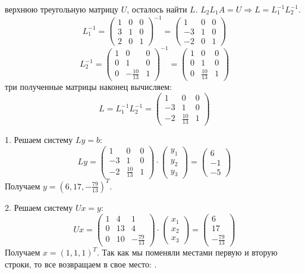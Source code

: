 \documentclass[9pt]{article}
\begin{document}
 верхнюю треугольную матрицу \(U\), осталось найти \(L\). \(L_2L_1A=U \Rightarrow L=L_1^{-1}L_2^{-1}\).
\[L_1^{-1}=\left(
\begin{array}{ccc}
    1 & 0 & 0\\
    3 & 1 & 0\\
    2 & 0 & 1
\end{array}
\right)^{-1}=\left(
\begin{array}{ccc}
    1 & 0 & 0\\
    -3 & 1 & 0\\
    -2 & 0 & 1
\end{array}
\right)\]
\[L_2^{-1}=\left(
\begin{array}{ccc}
    1 & 0 & 0\\
    0 & 1 & 0\\
    0 & -\frac{10}{13} & 1
\end{array}
\right)^{-1}=\left(
\begin{array}{ccc}
    1 & 0 & 0\\
    0 & 1 & 0\\
    0 & \frac{10}{13} & 1
\end{array}
\right)\]
 три полученные матрицы наконец вычисляем:
\[L=L_1^{-1}L_2^{-1}=\left(
\begin{array}{ccc}
    1 & 0 & 0\\
    -3 & 1 & 0\\
    -2 & \frac{10}{13} & 1
\end{array}
\right)\]
\par1. Решаем систему \(Ly=b\):
\[Ly=\left(
\begin{array}{ccc}
    1 & 0 & 0\\
    -3 & 1 & 0\\
    -2 & \frac{10}{13} & 1
\end{array}
\right)\cdot\left(
\begin{array}{c}
    y_1\\
    y_2\\
    y_3
\end{array}
\right)=\left(
\begin{array}{c}
    6\\
    -1\\
    -5
\end{array}
\right)\]
Получаем \(y=(6, 17, -\frac{79}{13})^T\).
\par2. Решаем систему \(Ux=y\):
\[Ux=\left(
\begin{array}{ccc}
    1 & 4 & 1\\
    0 & 13 & 4\\
    0 & 10 & -\frac{79}{13}
\end{array}
\right)\cdot\left(
\begin{array}{c}
    x_1\\
    x_2\\
    x_3
\end{array}
\right)=\left(
\begin{array}{c}
    6\\
    17\\
    -\frac{79}{13}
\end{array}
\right)\]
Получаем \(x=(1,1,1)^T\). Так как мы поменяли местами первую и вторую строки, то все возвращаем в свое место: .
\end{document}
